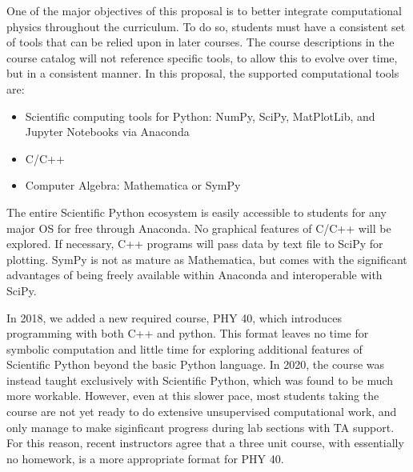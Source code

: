 \documentclass[12pt]{article}
\begin{document}
One of the major objectives of this proposal is to better integrate
computational physics throughout the curriculum.  To do so, students
must have a consistent set of tools that can be relied upon in later
courses.  The course descriptions in the course catalog will not
reference specific tools, to allow this to evolve over time, but in a
consistent manner.  In this proposal, the supported computational
tools are:
\begin{itemize}
\item Scientific computing tools for Python: NumPy, SciPy, MatPlotLib,
  and Jupyter Notebooks via Anaconda
\item C/C++
\item Computer Algebra:  Mathematica or SymPy
\end{itemize}
The entire Scientific Python ecosystem is easily accessible to
students for any major OS for free through Anaconda.  No graphical
features of C/C++ will be explored.  If necessary, C++ programs will
pass data by text file to SciPy for plotting.  SymPy is not as mature
as Mathematica, but comes with the significant advantages of being
freely available within Anaconda and interoperable with SciPy.

In 2018, we added a new required course, PHY 40, which introduces
programming with both C++ and python.  This format leaves no time for
symbolic computation and little time for exploring additional features
of Scientific Python beyond the basic Python language.  In 2020, the
course was instead taught exclusively with Scientific Python, which
was found to be much more workable.  However, even at this slower
pace, most students taking the course are not yet ready to do
extensive unsupervised computational work, and only manage to make
siginficant progress during lab sections with TA support.  For this
reason, recent instructors agree that a three unit course, with
essentially no homework, is a more appropriate format for PHY 40.
\end{document}
